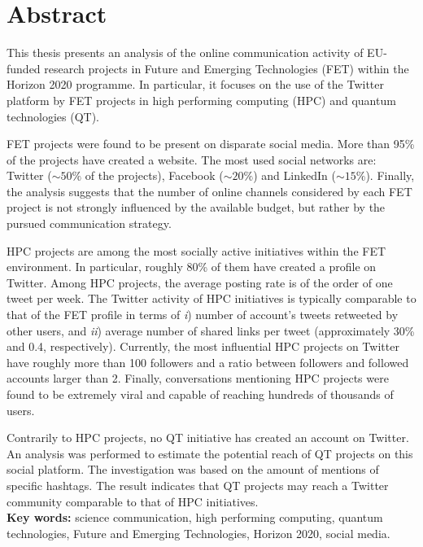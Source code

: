 \chapter*{Abstract}
This thesis presents an analysis of the online communication activity of EU-funded research projects in Future and Emerging Technologies (FET) within the Horizon 2020 programme. In particular, it focuses on the use of the Twitter platform by FET projects in high performing computing (HPC) and quantum technologies (QT).

FET projects were found to be present on disparate social media. More than 95\% of the projects have created a website. The most used social networks are: Twitter ($\sim 50\%$ of the projects), Facebook ($\sim 20\%$) and LinkedIn ($\sim 15\%$). Finally, the analysis suggests that the number of online channels considered by each FET project is not strongly influenced by the available budget, but rather by the pursued communication strategy.

HPC projects are among the most socially active initiatives within the FET environment. In particular, roughly 80\% of them have created a profile on Twitter. Among HPC projects, the average posting rate is of the order of one tweet per week. The Twitter activity of HPC initiatives is typically comparable to that of the FET profile in terms of \textit{i}) number of account's tweets retweeted by other users, and \textit{ii}) average number of shared links per tweet (approximately 30\% and 0.4, respectively). Currently, the most influential HPC projects on Twitter have roughly more than 100 followers and a ratio between followers and followed accounts larger than 2. Finally, conversations mentioning HPC projects were found to be extremely viral and capable of reaching hundreds of thousands of users.

Contrarily to HPC projects, no QT initiative has created an account on Twitter. An analysis was performed to estimate the potential reach of QT projects on this social platform. The investigation was based on the amount of mentions of specific hashtags. The result indicates that QT projects may reach a Twitter community comparable to that of HPC initiatives. \\

\noindent
\textbf{Key words:} science communication, high performing computing, quantum technologies, Future and Emerging Technologies, Horizon 2020, social media.